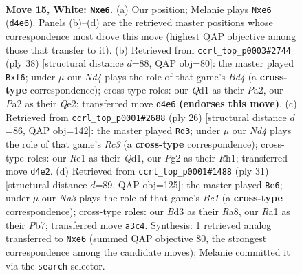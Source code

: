 \documentclass[11pt]{article}
\begin{document}
\clearpage

\begin{figure}[p]\centering
\begin{subfigure}{0.46\textwidth}\centering
\resizebox{\linewidth}{!}{%
\newchessgame
\chessboard[
  setfen={r5k1/pp2rppp/2nbbq2/3p4/3N4/N2B4/PPP2PPP/R2QR1K1 w - - 3 15},
  showmover=false,
  pgfstyle=straightmove, color=movearrow, markmove={d4-e6}
]}
\caption{}
\end{subfigure}\hfill
\begin{subfigure}{0.46\textwidth}\centering
\resizebox{\linewidth}{!}{%
\newchessgame
\chessboard[
  setfen={2r2rk1/p1q2ppp/1p2pb2/3n4/2NB1P2/1P2P3/P3Q1PP/2RR2K1 w - - 1 20},
  showmover=false,
  pgfstyle=straightmove, color=movearrow, markmove={d4-f6}
]}
\caption{}
\end{subfigure}
\\[4pt]
\begin{subfigure}{0.46\textwidth}\centering
\resizebox{\linewidth}{!}{%
\newchessgame
\chessboard[
  setfen={r4rk1/pp3pp1/2n1bq1p/3p4/3N4/P1R1P3/1P2BPPP/3QK2R w K - 3 14},
  showmover=false,
  pgfstyle=straightmove, color=movearrow, markmove={c3-d3}
]}
\caption{}
\end{subfigure}\hfill
\begin{subfigure}{0.46\textwidth}\centering
\resizebox{\linewidth}{!}{%
\newchessgame
\chessboard[
  setfen={r1bq1rk1/1p2bppp/2p5/3nP3/p4B2/2N3P1/PPQ2PBP/R2R2K1 b - - 1 16},
  showmover=false,
  pgfstyle=straightmove, color=movearrow, markmove={c8-e6}
]}
\caption{}
\end{subfigure}
\caption{\textbf{Move 15, White: \texttt{Nxe6}.} (a) Our position; Melanie plays \texttt{Nxe6} (\texttt{d4e6}). Panels (b)--(d) are the retrieved master positions whose correspondence most drove this move (highest QAP objective among those that transfer to it). (b) Retrieved from \texttt{ccrl\_top\_p0003\#2744} (ply 38) [structural distance $d$=88, QAP obj=80]: the master played \texttt{Bxf6}; under $\mu$ our \emph{Nd4} plays the role of that game's \emph{Bd4} (a \textbf{cross-type} correspondence); cross-type roles: our \emph{Q}d1 as their \emph{P}a2, our \emph{P}a2 as their \emph{Q}e2; transferred move \texttt{d4e6} \textbf{(endorses this move)}. (c) Retrieved from \texttt{ccrl\_top\_p0001\#2688} (ply 26) [structural distance $d$=86, QAP obj=142]: the master played \texttt{Rd3}; under $\mu$ our \emph{Nd4} plays the role of that game's \emph{Rc3} (a \textbf{cross-type} correspondence); cross-type roles: our \emph{R}e1 as their \emph{Q}d1, our \emph{P}g2 as their \emph{R}h1; transferred move \texttt{d4e2}. (d) Retrieved from \texttt{ccrl\_top\_p0001\#1488} (ply 31) [structural distance $d$=89, QAP obj=125]: the master played \texttt{Be6}; under $\mu$ our \emph{Na3} plays the role of that game's \emph{Bc1} (a \textbf{cross-type} correspondence); cross-type roles: our \emph{B}d3 as their \emph{R}a8, our \emph{R}a1 as their \emph{P}b7; transferred move \texttt{a3c4}. Synthesis: 1 retrieved analog transferred to \texttt{Nxe6} (summed QAP objective 80, the strongest correspondence among the candidate moves); Melanie committed it via the \texttt{search} selector.}
\label{fig:thought-m28}
\end{figure}
\end{document}
